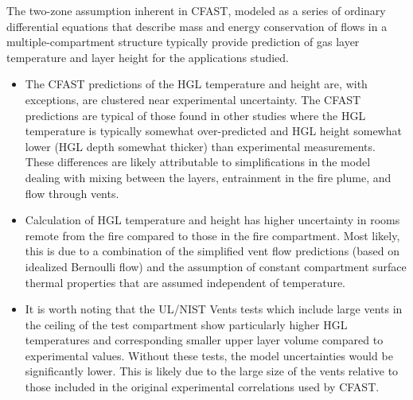 The two-zone assumption inherent in CFAST, modeled as a series of ordinary differential equations that describe mass and energy conservation of flows in a multiple-compartment structure typically provide prediction of gas layer temperature and layer height for the applications studied.

\begin{itemize}
\item The CFAST predictions of the HGL temperature and height are, with exceptions, are clustered near experimental uncertainty. The CFAST predictions are typical of those found in other studies where the HGL temperature is typically somewhat over-predicted and HGL height somewhat lower (HGL depth somewhat thicker) than experimental measurements. These differences are likely attributable to simplifications in the model dealing with mixing between the layers, entrainment in the fire plume, and flow through vents.
\item Calculation of HGL temperature and height has higher uncertainty in rooms remote from the fire compared to those in the fire compartment.  Most likely, this is due to a combination of the simplified vent flow predictions (based on idealized Bernoulli flow) and the assumption of constant compartment surface thermal properties that are assumed independent of temperature.
\item It is worth noting that the UL/NIST Vents tests which include large vents in the ceiling of the test compartment show particularly higher HGL temperatures and corresponding smaller upper layer volume compared to experimental values.  Without these tests, the model uncertainties would be significantly lower.  This is likely due to the large size of the vents relative to those included in the original experimental correlations used by CFAST.
\end{itemize}




